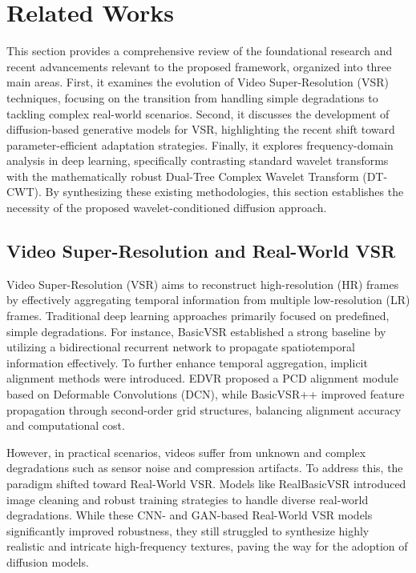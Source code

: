 \section{Related Works}

This section provides a comprehensive review of the foundational research and recent advancements relevant to the proposed framework, organized into three main areas. First, it examines the evolution of Video Super-Resolution (VSR) techniques, focusing on the transition from handling simple degradations to 
tackling complex real-world scenarios. Second, it discusses the development of diffusion-based generative models for VSR, highlighting the recent shift toward parameter-efficient adaptation strategies. Finally, it explores frequency-domain analysis in deep learning, specifically contrasting standard wavelet transforms with the mathematically robust Dual-Tree Complex Wavelet Transform (DT-CWT). By synthesizing these existing methodologies, this section establishes the necessity of the proposed wavelet-conditioned diffusion approach.


\subsection{Video Super-Resolution and Real-World VSR} Video Super-Resolution (VSR) aims to reconstruct high-resolution (HR) frames by effectively aggregating temporal information from multiple low-resolution (LR) frames. Traditional deep learning approaches primarily focused on predefined, simple degradations. For instance, BasicVSR \cite{chan2021basicvsr} established a strong baseline by utilizing a bidirectional recurrent network to propagate spatiotemporal information effectively. To further enhance temporal aggregation, implicit alignment methods were introduced. EDVR \cite{wang2019edvr} proposed a PCD alignment 
module based on Deformable Convolutions (DCN), while BasicVSR++ \cite{chan2022basicvsrplusplus} improved feature propagation through second-order grid structures, balancing alignment accuracy and computational cost.

However, in practical scenarios, videos suffer from unknown and complex degradations such as sensor noise and compression artifacts. To address this, the paradigm shifted toward Real-World VSR. Models like RealBasicVSR \cite{chan2022realbasicvsr} introduced image cleaning and robust training strategies to handle diverse real-world degradations. While these CNN- and GAN-based Real-World VSR models significantly improved robustness, they still struggled to synthesize highly realistic and intricate high-frequency textures, paving the way for the adoption of diffusion models.


